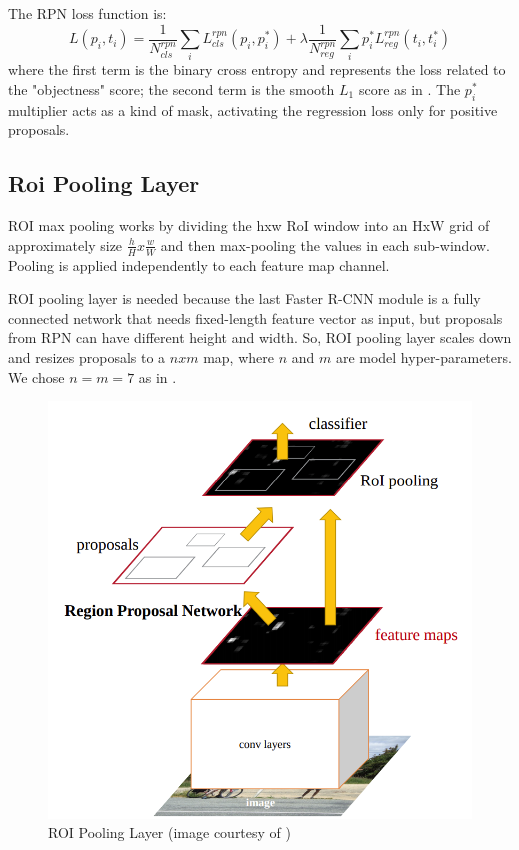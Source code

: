 \documentclass[a4paper,10pt]{report}
\begin{document}
The RPN loss function is:
\[L({p_i}, {t_i}) = \dfrac{1}{N_{cls}^{rpn}} \sum_{i} L_{cls}^{rpn}(p_i, p_i^*) + \lambda \dfrac{1}{N_{reg}^{rpn}} \sum_{i} p_i^* L_{reg}^{rpn}(t_i, t_i^*) \]	
where the first term is the binary cross entropy and represents the loss related to the "objectness" score; the second term is the smooth $L_1$ score as in \cite{huber-loss}. The $p_i^*$ multiplier acts as a kind of mask, activating the regression loss only for positive proposals.

\subsection{Roi Pooling Layer}\label{subsec:roi-pooling}
ROI max pooling works by dividing the hxw RoI window into an HxW grid of approximately size $\frac{h}{H} x \frac{w}{W}$ and then max-pooling the values in each sub-window. Pooling is applied independently to each feature map channel.

ROI pooling layer is needed because the last Faster R-CNN module is a fully connected network that needs fixed-length feature vector as input, but proposals from RPN can have different height and width. So, ROI pooling layer scales down and resizes proposals to a $nxm$ map, where $n$ and $m$ are model hyper-parameters. We chose $n=m=7$ as in \cite{faster-rcnn}.
\begin{figure}[h]
  \center
  \includegraphics[width=0.85\linewidth]{roi-pooling}
  \caption{ROI Pooling Layer (image courtesy of \cite{roi-pooling})}
  \label{fig:roi-pooling}
\end{figure}
\end{document}
